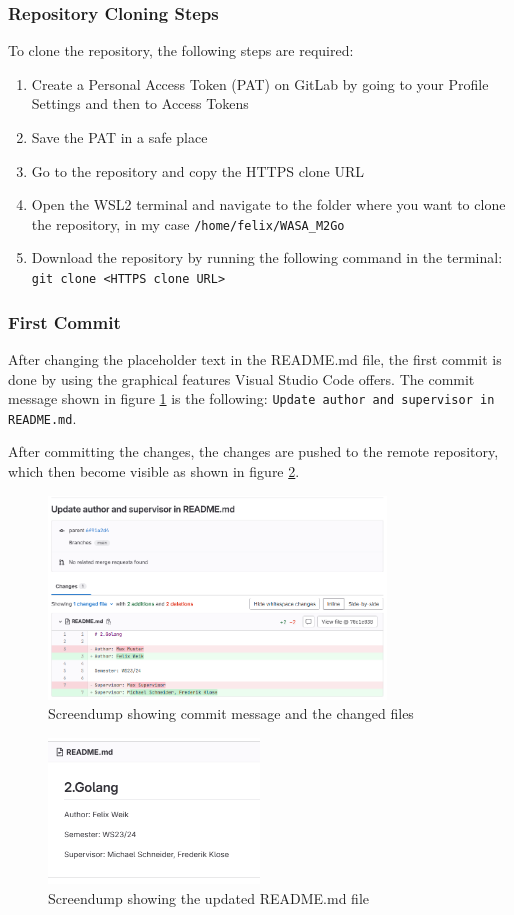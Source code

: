 \subsubsection*{Repository Cloning Steps}
To clone the repository, the following steps are required:
\begin{enumerate}
    \item Create a Personal Access Token (PAT) on GitLab by going to your Profile Settings and then to Access Tokens
    \item Save the PAT in a safe place
    \item Go to the repository and copy the HTTPS clone URL
    \item Open the WSL2 terminal and navigate to the folder where you want to clone the repository, in my case \texttt{/home/felix/WASA\_M2Go}
    \item Download the repository by running the following command in the terminal: \texttt{git clone <HTTPS clone URL>}
\end{enumerate}

\subsubsection*{First Commit}
After changing the placeholder text in the README.md file, the first commit is done by using the graphical features Visual Studio Code offers.
The commit message shown in figure \ref*{fig:screendump_readmeCommitMessage} is the following: \texttt{Update author and supervisor in README.md}.

After committing the changes, the changes are pushed to the remote repository, which then become visible as shown in figure \ref*{fig:screendump_readme}.

\begin{figure}[h]
    \centering
    \includegraphics[width=0.8\textwidth]{figures/goLang/golang_screendumpReadmeCommit.png}
    \caption{Screendump showing commit message and the changed files}
    \label{fig:screendump_readmeCommitMessage}
\end{figure}

\begin{figure}[h]
    \centering
    \includegraphics[width=0.5\textwidth]{figures/goLang/golang_screendumpReadme.png}
    \caption{Screendump showing the updated README.md file}
    \label{fig:screendump_readme}
\end{figure}

